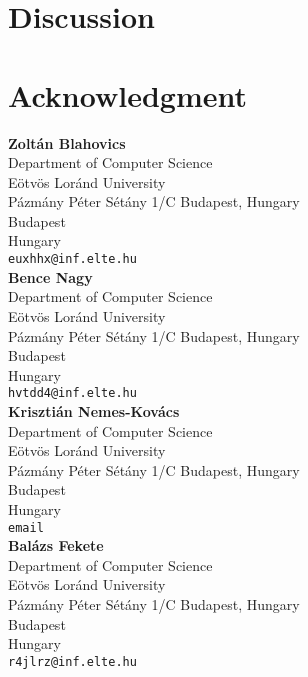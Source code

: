 \documentclass[10pt,leqno,twoside]{article}
\begin{document}



\section{Discussion} %



\section*{Acknowledgment}



\printbibliography[title=References]


\clearpage
\vspace{2cm}

\noindent\textbf{Zoltán Blahovics}\\
Department of Computer Science\\Eötvös Loránd University\\Pázmány Péter Sétány 1/C Budapest, Hungary\\
Budapest\\
Hungary\\
{\tt euxhhx@inf.elte.hu}\\

\noindent\textbf{Bence Nagy}\\
Department of Computer Science\\Eötvös Loránd University\\Pázmány Péter Sétány 1/C Budapest, Hungary\\
Budapest\\
Hungary\\
{\tt hvtdd4@inf.elte.hu}\\

\noindent\textbf{Krisztián Nemes-Kovács}\\
Department of Computer Science\\Eötvös Loránd University\\Pázmány Péter Sétány 1/C Budapest, Hungary\\
Budapest\\
Hungary\\
{\tt email}\\

\noindent\textbf{Balázs Fekete}\\
Department of Computer Science\\Eötvös Loránd University\\Pázmány Péter Sétány 1/C Budapest, Hungary\\
Budapest\\
Hungary\\
{\tt r4jlrz@inf.elte.hu}\\
\end{document}
